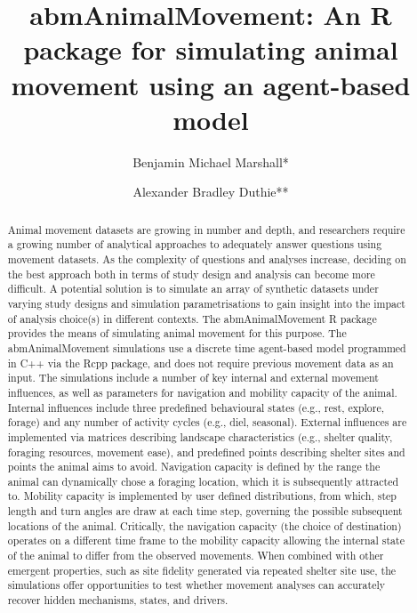\documentclass[10pt,a4paper]{article}
\begin{document}
\pagestyle{fancy}

\title{abmAnimalMovement: An R package for simulating animal movement using an agent-based model}
\author[1]{Benjamin Michael Marshall*}
\author[1]{Alexander Bradley Duthie**}


\maketitle
\thispagestyle{fancy}

\begin{abstract}

Animal movement datasets are growing in number and depth, and researchers require a growing number of analytical approaches to adequately answer questions using movement datasets. As the complexity of questions and analyses increase, deciding on the best approach both in terms of study design and analysis can become more difficult. A potential solution is to simulate an array of synthetic datasets under varying study designs and simulation parametrisations to gain insight into the impact of analysis choice(s) in different contexts. The abmAnimalMovement R package provides the means of simulating animal movement for this purpose. The abmAnimalMovement simulations use a discrete time agent-based model programmed in C++ via the Rcpp package, and does not require previous movement data as an input. The simulations include a number of key internal and external movement influences, as well as parameters for navigation and mobility capacity of the animal. Internal influences include three predefined behavioural states (e.g., rest, explore, forage) and any number of activity cycles (e.g., diel, seasonal). External influences are implemented via matrices describing landscape characteristics (e.g., shelter quality, foraging resources, movement ease), and predefined points describing shelter sites and points the animal aims to avoid. Navigation capacity is defined by the range the animal can dynamically chose a foraging location, which it is subsequently attracted to. Mobility capacity is implemented by user defined distributions, from which, step length and turn angles are draw at each time step, governing the possible subsequent locations of the animal. Critically, the navigation capacity (the choice of destination) operates on a different time frame to the mobility capacity allowing the internal state of the animal to differ from the observed movements. When combined with other emergent properties, such as site fidelity generated via repeated shelter site use, the simulations offer opportunities to test whether movement analyses can accurately recover hidden mechanisms, states, and drivers.

\end{abstract}
\end{document}
